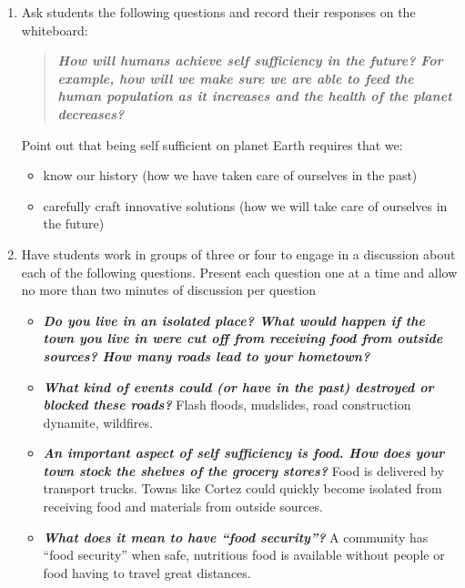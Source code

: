 \documentclass[12pt,]{article}
\providecommand{\tightlist}{%
  \setlength{\itemsep}{0pt}\setlength{\parskip}{0pt}}
\begin{document}
\begin{enumerate}
\def\labelenumi{\arabic{enumi}.}
\setcounter{enumi}{1}
\item
  Ask students the following questions and record their responses on
  the whiteboard:

  \begin{quote}
  \textbf{\emph{How will humans achieve self sufficiency in the
  future? For example, how will we make sure we are able to feed the
  human population as it increases and the health of the planet
  decreases? }}
  \end{quote}

  Point out that being self sufficient on planet Earth
  requires that we:

  \begin{itemize}
  \tightlist
  \item
    know our history (how we have taken care of ourselves in the past)
  \item
    carefully craft innovative solutions (how we will take care of
    ourselves in the future)
  \end{itemize}
\item
  Have students work in groups of three or four to engage in a
  discussion about each of the following questions. Present each
  question one at a time and allow no more than two minutes of
  discussion per question

  \begin{itemize}
  \tightlist
  \item
    \textbf{\emph{Do you live in an isolated place? What would happen if the town
    you live in were cut off from receiving food from outside sources?
    How many roads lead to your hometown? }}
  \item
    \textbf{\emph{What kind of events could (or have in the past) destroyed or
    blocked these roads? }}
    Flash floods, mudslides, road construction dynamite, wildfires.
  \item
    \textbf{\emph{An important aspect of self sufficiency is food. How does your
    town stock the shelves of the grocery stores?}}
    Food is delivered by transport trucks. Towns like Cortez could quickly
    become isolated from receiving food and materials from outside
    sources.
  \item
    \textbf{\emph{What does it mean to have ``food security''? }}
    A community has ``food security'' when safe, nutritious food is
    available without people or food having to travel great distances.
  \end{itemize}
\end{enumerate}
\end{document}
